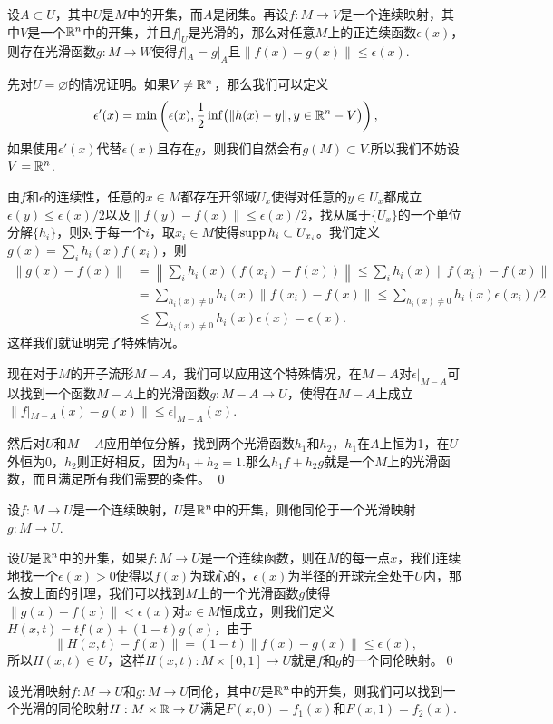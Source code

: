 \lem 设$A\subset U$，其中$U$是$M$中的开集，而$A$是闭集。再设$f:M\to V$是一个连续映射，其中$V$是一个$\mathbb{R}^n$中的开集，并且$f|_{U}$是光滑的，那么对任意$M$上的正连续函数$\epsilon(x)$，则存在光滑函数$g:M\to W$使得$f|_A=g|_A$且$\|f(x)-g(x)\|\leq \epsilon(x)$.

\proof
	先对$U=\varnothing$的情况证明。如果$V\neq \mathbb{R}^n$，那么我们可以定义
	\[
		\epsilon'(x)=\min\left(\epsilon(x),\frac{1}{2}\inf\bigl(\|h(x)-y\|,y\in \mathbb{R}^n-V\bigr)\right),
	\]
	如果使用$\epsilon'(x)$代替$\epsilon(x)$且存在$g$，则我们自然会有$g(M)\subset V$.所以我们不妨设$V=\mathbb{R}^n$.

	由$f$和$\epsilon$的连续性，任意的$x\in M$都存在开邻域$U_x$使得对任意的$y\in U_x$都成立$\epsilon(y)\leq \epsilon(x)/2$以及$\|f(y)-f(x)\|\leq \epsilon(x)/2$，找从属于$\{U_x\}$的一个单位分解$\{h_i\}$，则对于每一个$i$，取$x_i\in M$使得$\operatorname{supp} h_i\subset U_{x_i}$。我们定义$g(x)=\sum_i h_i(x)f(x_i)$，则
	\[
	\begin{split}
		\|g(x)-f(x)\|&=\left\|\sum_i h_i(x)(f(x_i)-f(x))\right\|\leq \sum_i h_i(x)\|f(x_i)-f(x)\|\\
		&=\sum_{h_i(x)\neq 0} h_i(x)\|f(x_i)-f(x)\|\leq  \sum_{h_i(x)\neq 0} h_i(x)\epsilon(x_i)/2\\
		&\leq  \sum_{h_i(x)\neq 0} h_i(x)\epsilon(x)=\epsilon(x).
	\end{split}
	\]
	这样我们就证明完了特殊情况。

	现在对于$M$的开子流形$M-A$，我们可以应用这个特殊情况，在$M-A$对$\epsilon|_{M-A}$可以找到一个函数$M-A$上的光滑函数$g:M-A\to U$，使得在$M-A$上成立$\|f|_{M-A}(x)-g(x)\|\leq \epsilon|_{M-A}(x)$.

	然后对$U$和$M-A$应用单位分解，找到两个光滑函数$h_1$和$h_2$，$h_1$在$A$上恒为1，在$U$外恒为0，$h_2$则正好相反，因为$h_1+h_2=1$.那么$h_1f+h_2g$就是一个$M$上的光滑函数，而且满足所有我们需要的条件。
\qed

\pro 设$f:M\to U$是一个连续映射，$U$是$\mathbb{R}^n$中的开集，则他同伦于一个光滑映射$g:M\to U$.

\proof 设$U$是$\mathbb{R}^n$中的开集，如果$f:M\to U$是一个连续函数，则在$M$的每一点$x$，我们连续地找一个$\epsilon(x)>0$使得以$f(x)$为球心的，$\epsilon(x)$为半径的开球完全处于$U$内，那么按上面的引理，我们可以找到$M$上的一个光滑函数$g$使得$\|g(x)-f(x)\|<\epsilon(x)$对$x\in M$恒成立，则我们定义$H(x,t)=tf(x)+(1-t)g(x)$，由于
\[
	\|H(x,t)-f(x)\|=(1-t)\|f(x)-g(x)\|\leq \epsilon(x),
\]
所以$H(x,t)\in U$，这样$H(x,t):M\times [0,1]\to U$就是$f$和$g$的一个同伦映射。\qed

\lem 设光滑映射$f:M\to U$和$g:M\to U$同伦，其中$U$是$\mathbb{R}^n$中的开集，则我们可以找到一个光滑的同伦映射$H:M\times \mathbb{R}\to U$满足$F(x,0)=f_1(x)$和$F(x,1)=f_2(x)$.

